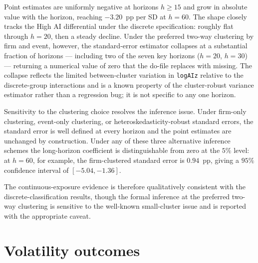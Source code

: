 Point estimates are uniformly negative at horizons $h \geq 15$ and
grow in absolute value with the horizon, reaching $-3.20$~pp per SD
at $h = 60$. The shape closely tracks the High AI differential under
the discrete specification: roughly flat through $h = 20$, then a
steady decline. Under the preferred two-way clustering by firm and
event, however, the standard-error estimator collapses at a
substantial fraction of horizons --- including two of the seven key
horizons ($h = 20$, $h = 30$) --- returning a numerical value of
zero that the do-file replaces with missing. The collapse reflects
the limited between-cluster variation in \texttt{logAIz} relative to
the discrete-group interactions and is a known property of the
cluster-robust variance estimator rather than a regression bug; it
is not specific to any one horizon.

Sensitivity to the clustering choice resolves the inference issue.
Under firm-only clustering, event-only clustering, or
heteroskedasticity-robust standard errors, the standard error is
well defined at every horizon and the point estimates are unchanged
by construction. Under any of these three alternative inference
schemes the long-horizon coefficient is distinguishable from zero at
the $5\%$ level: at $h = 60$, for example, the firm-clustered
standard error is $0.94$~pp, giving a $95\%$ confidence interval of
$[-5.04, -1.36]$.

\begin{table}[htbp]
\centering\small
\caption[Continuous \texttt{logAIz}: VCE sensitivity]{Continuous
\texttt{logAIz}: VCE sensitivity at key horizons}
\label{tab:logaiz_vce_sensitivity}

\end{table}

The continuous-exposure evidence is therefore qualitatively
consistent with the discrete-classification results, though the
formal inference at the preferred two-way clustering is sensitive to
the well-known small-cluster issue and is reported with the
appropriate caveat.

\section{Volatility outcomes}
\label{app:rob-volatility}

